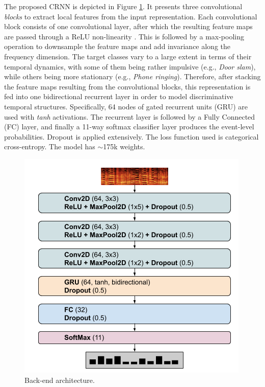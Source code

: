 The proposed CRNN is depicted in Figure \ref{fig:archi}.
It presents three convolutional \textit{blocks} to extract local features from the input representation.
Each convolutional block consists of one convolutional layer, after which the resulting feature maps are passed through a ReLU non-linearity \cite{nair2010rectified}.
This is followed by a max-pooling operation to downsample the feature maps and add invariance along the frequency dimension.
The target classes vary to a large extent in terms of their temporal dynamics, with some of them being rather impulsive (e.g., \textit{Door slam}), while others being more stationary (e.g., \textit{Phone ringing}). 
Therefore, after stacking the feature maps resulting from the convolutional blocks, this representation is fed into one bidirectional recurrent layer in order to model discriminative temporal structures.
Specifically, 64 nodes of gated recurrent units (GRU) are used with \textit{tanh} activations.
The recurrent layer is followed by a Fully Connected (FC) layer, and finally a 11-way softmax classifier layer produces the event-level probabilities.
Dropout is applied extensively.
The loss function used is categorical cross-entropy.
The model has $\sim$175k weights.

\begin{figure}[ht]
  \vspace{-3mm}
  \centering
  \centerline{\includegraphics[width=\textwidth]{Figures/SELD/DCASE19Task3_backend_archi_v3.png}}
  \vspace{-2mm}
  \caption{Back-end architecture.}
  \label{fig:archi}
    \vspace{-5mm}
\end{figure}




